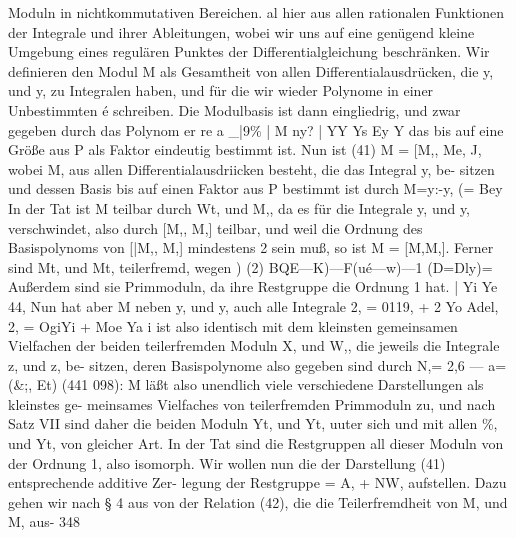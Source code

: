 \documentclass[11pt,a4paper]{article}
\theoremstyle{plain}
\theoremstyle{definition}
\begin{document}
Moduln in nichtkommutativen Bereichen. 
al 
hier aus allen rationalen Funktionen der Integrale und ihrer Ableitungen, 
wobei wir uns auf eine genügend kleine Umgebung eines regulären Punktes 
der Differentialgleichung beschränken. 
Wir definieren 
den Modul M als 
Gesamtheit von allen Differentialausdrücken, die y, und y, zu Integralen 
haben, und für die wir wieder Polynome in einer Unbestimmten é schreiben. 
Die Modulbasis ist dann eingliedrig, und zwar gegeben durch das Polynom 
er re a 
\_|9\% | 
M 
ny? 
| YY Ys Ey 
Y 
das bis auf eine Größe aus P als Faktor eindeutig bestimmt ist. 
Nun ist 
(41) 
M = [M,, 
Me, J, 
wobei M, aus allen Differentialausdriicken besteht, die das Integral y, be- 
sitzen 
und dessen Basis bis auf einen Faktor aus P bestimmt ist durch 
M=y:-y, 
(= Bey 
In der Tat ist M teilbar durch Wt, und M,, da es für die Integrale y, 
und y, verschwindet, also durch [M,, M,] teilbar, und weil die Ordnung 
des 
Basispolynoms 
von 
[|M,, M,] 
mindestens 
2 
sein 
muß, 
so 
ist 
M = [M,M,]. 
Ferner sind Mt, und Mt, teilerfremd, wegen 
) 
(2) 
BQE---K)---F(ué---w)---1 
(D=Dly)= 
Außerdem sind sie Primmoduln, 
da ihre Restgruppe die Ordnung 1 hat. 
| Yi Ye 
44, 
Nun hat aber M neben y, und y, auch alle Integrale 
2, = 0119, + 2 Yo 
Adel, 
2, = OgiYi 
+ Moe Ya 
i 
ist also identisch mit dem kleinsten gemeinsamen Vielfachen der beiden 
teilerfremden Moduln X, und W,, die jeweils die Integrale z, und z, be- 
sitzen, deren Basispolynome also gegeben sind durch 
N,= 2,6 --- a= (\&;, Et) (441 098): 
M läßt also unendlich viele verschiedene Darstellungen als kleinstes ge- 
meinsames Vielfaches von teilerfremden Primmoduln zu, und nach Satz VII 
sind daher die beiden Moduln Yt, und Yt, uuter sich und mit allen 
\%, und Yt, von gleicher Art. 
In der Tat sind die Restgruppen all dieser 
Moduln von der Ordnung 1, also isomorph. 
Wir wollen nun die der Darstellung (41) entsprechende additive Zer- 
legung der Restgruppe  = A, + NW, aufstellen. 
Dazu gehen wir nach \S{} 4 
aus von der Relation (42), die die Teilerfremdheit von M, und M, aus- 
348
\end{document}
